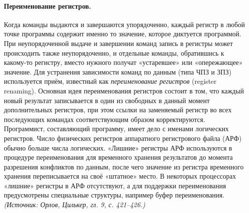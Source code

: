 \documentclass[a4paper,12pt]{article}
\begin{document}
\paragraph{Переименование регистров.}
Когда команды выдаются и завершаются упорядоченно, каждый регистр в любой точке программы содержит именно то значение, которое диктуется программой. При неупорядоченной выдаче и завершении команд запись в регистры может происходить также неупорядоченно, и отдельные команды, обратившись к какому-то регистру, вместо нужного получат «устаревшее» или «опережающее» значение. Для устранения зависимости команд по данным (типа ЧПЗ и ЗПЗ) используется приём, известный как \emph{переименование регистров} (register renaming). Основная идея переименования регистров состоит в том, что каждый новый результат записывается в один из свободных в данный момент дополнительных регистров, при этом ссылки на заменяемый регистр во всех последующих командах соответствующим образом корректируются. Программист, составляющий программу, имеет дело с именами логических регистров. Число физических регистров аппаратного регистрового файла (АРФ) обычно больше числа логических. «Лишние» регистры АРФ используются в процедуре переименования для временного хранения результатов до момента разрешения конфликтов по данным, после чего значение из регистра временного хранения переписывается на своё «штатное» место. В некоторых процессорах «лишние» регистры в АРФ отсутствуют, а для поддержки переименования предусмотрены специальные структуры, например буфер переименования.
\textit{(Источник: Орлов, Цилькер, гл. 9, с. 421--426.)}
\end{document}

